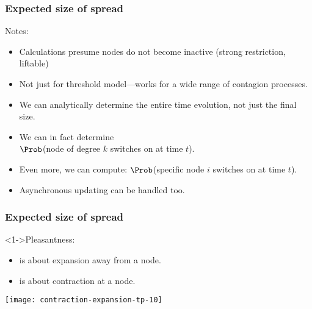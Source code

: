 \begin{frame}
  \frametitle{Expected size of spread}

  \begin{block}{Notes:}
    \begin{itemize}
    \item<1-> 
      Calculations presume
      nodes do not become inactive (strong restriction, liftable)
    \item<2->
      Not just for threshold model---works
      for a wide range of contagion processes.
    \item<3->
      We can analytically determine the entire time evolution,
      not just the final size.
    \item<4->
      We can in fact determine \\
      $\Prob$(node of degree $k$ switches on at time $t$).
    \item<5->
      Even more, we can compute:
      $\Prob$(specific node $i$ switches on at time $t$).
    \item<6->
      Asynchronous updating can be handled too.
    \end{itemize}
  \end{block}

\end{frame}


\begin{frame}
  \frametitle{Expected size of spread}

  \begin{block}<1->{Pleasantness:}
    \begin{itemize}
    \item<1-> 
       is about \alert{expansion} away from
      a node.
    \item<2-> 
       is about \alert{contraction} at
      a node.
    \end{itemize}
    \texttt{[image: contraction-expansion-tp-10]}
  \end{block}

\end{frame}

